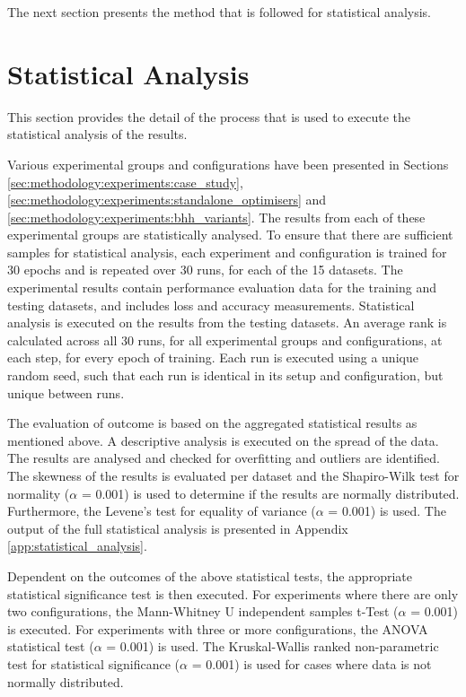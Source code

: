 The next section presents the method that is followed for statistical analysis.

\section{Statistical Analysis}
\label{sec:methodology:statistical_analysis}

This section provides the detail of the process that is used to execute the statistical analysis of the results.

Various experimental groups and configurations have been presented in Sections \ref{sec:methodology:experiments:case_study}, \ref{sec:methodology:experiments:standalone_optimisers} and \ref{sec:methodology:experiments:bhh_variants}. The results from each of these experimental groups are statistically analysed. To ensure that there are sufficient samples for statistical analysis, each experiment and configuration is trained for 30 epochs and is repeated over 30 runs, for each of the 15 datasets. The experimental results contain performance evaluation data for the training and testing datasets, and includes loss and accuracy measurements. Statistical analysis is executed on the results from the testing datasets. An average rank is calculated across all 30 runs, for all experimental groups and configurations, at each step, for every epoch of training. Each run is executed using a unique random seed, such that each run is identical in its setup and configuration, but unique between runs.

The evaluation of outcome is based on the aggregated statistical results as mentioned above. A descriptive analysis is executed on the spread of the data. The results are analysed and checked for overfitting and outliers are identified. The skewness of the results is evaluated per dataset and the Shapiro-Wilk test for normality ($\alpha$ = 0.001) is used to determine if the results are normally distributed. Furthermore, the Levene's test for equality of variance ($\alpha$ = 0.001) is used. The output of the full statistical analysis is presented in Appendix \ref{app:statistical_analysis}.

Dependent on the outcomes of the above statistical tests, the appropriate statistical significance test is then executed. For experiments where there are only two configurations, the Mann-Whitney U independent samples t-Test ($\alpha$ = 0.001) is executed. For experiments with three or more configurations, the \acf{ANOVA} statistical test ($\alpha$ = 0.001) is used. The Kruskal-Wallis ranked non-parametric test for statistical significance ($\alpha$ = 0.001) is used for cases where data is not normally distributed.


